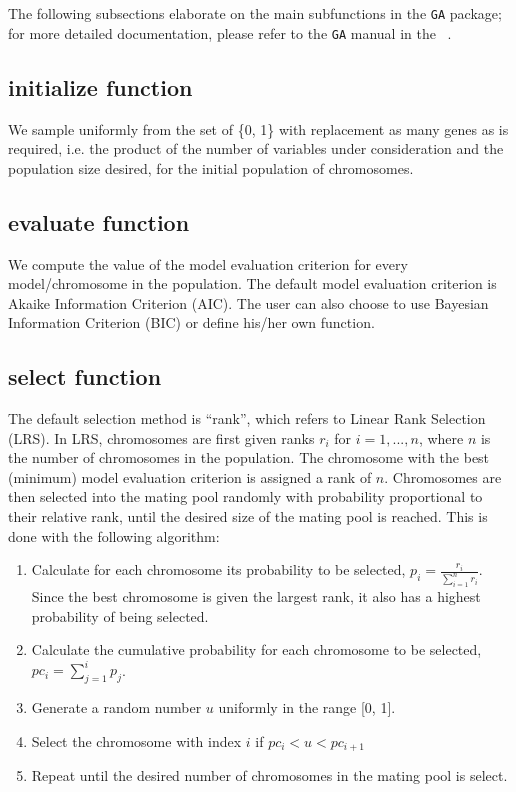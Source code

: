 \documentclass[11pt]{article}
\begin{document}
The following subsections elaborate on the main subfunctions in the \texttt{GA} package; for more detailed documentation, please refer to the \texttt{GA} manual in the ~.

\subsection*{initialize function}
We sample uniformly from the set of \{0, 1\} with replacement as many genes as is required, i.e. the product of the number of variables under consideration and the population size desired, for the initial population of chromosomes.

\subsection*{evaluate function}
We compute the value of the model evaluation criterion for every model/chromosome in the population. The default model evaluation criterion is Akaike Information Criterion (AIC). The user can also choose to use Bayesian Information Criterion (BIC) or define his/her own function.

\subsection*{select function}
The default selection method is ``rank'', which refers to Linear Rank Selection (LRS). In LRS, chromosomes are first given ranks $r_i$ for $i = 1, ..., n$, where $n$ is the number of chromosomes in the population. The chromosome with the best (minimum) model evaluation criterion is assigned a rank of $n$. Chromosomes are then selected into the mating pool randomly with probability proportional to their relative rank, until the desired size of the mating pool is reached. This is done with the following algorithm:
\begin{enumerate}
\item Calculate for each chromosome its probability to be selected, $p_i = \frac{r_i}{\sum\limits_{i=1}^n{r_i}}$. Since the best chromosome is given the largest rank, it also has a highest probability of being selected.
\item Calculate the cumulative probability for each chromosome to be selected, $pc_i = \sum\limits_{j=1}^i{p_j}$.
\item Generate a random number $u$ uniformly in the range [0, 1].
\item Select the chromosome with index $i$ if $pc_i < u < pc_{i+1}$
\item Repeat until the desired number of chromosomes in the mating pool is select.
\end{enumerate}
\end{document}
